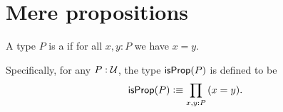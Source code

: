 \documentclass[hott-all.tex]{subfiles}
\begin{document}
\section{Mere propositions}
\label{subsec:hprops}
%
%

\begin{defn}\label{defn:isprop}
  A type $P$ is a 
  if for all $x,y:P$ we have $x=y$.
\end{defn}

Specifically, for any $P:\mathcal{U}$, the type $\mathsf{isProp}(P)$ is defined to be
\[ \isprop(P) \defeq \prd{x,y:P} (x=y). \]
\end{document}

